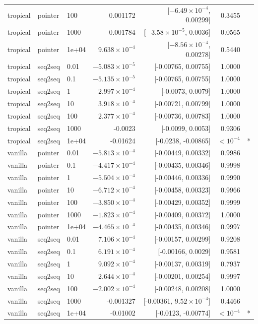 \documentclass[10pt]{article}
\begin{document}
{\begin{longtable}{lllrrrl}
tropical & pointer & 100 & 0.001172 & [$-6.49\times10^{-4}$, 0.00299] & 0.3455 & \\
tropical & pointer & 1000 & 0.001784 & [$-3.58\times10^{-5}$, 0.0036] & 0.0565 & \\
tropical & pointer & 1e+04 & $9.638\times10^{-4}$ & [$-8.56\times10^{-4}$, 0.00278] & 0.5440 & \\
tropical & seq2seq & 0.01 & $-5.083\times10^{-5}$ & [-0.00765, 0.00755] & 1.0000 & \\
tropical & seq2seq & 0.1 & $-5.135\times10^{-5}$ & [-0.00765, 0.00755] & 1.0000 & \\
tropical & seq2seq & 1 & $2.997\times10^{-4}$ & [-0.0073, 0.0079] & 1.0000 & \\
tropical & seq2seq & 10 & $3.918\times10^{-4}$ & [-0.00721, 0.00799] & 1.0000 & \\
tropical & seq2seq & 100 & $2.377\times10^{-4}$ & [-0.00736, 0.00783] & 1.0000 & \\
tropical & seq2seq & 1000 & -0.0023 & [-0.0099, 0.0053] & 0.9306 & \\
tropical & seq2seq & 1e+04 & -0.01624 & [-0.0238, -0.00865] & $<10^{-4}$ & *\\
vanilla & pointer & 0.01 & $-5.813\times10^{-4}$ & [-0.00449, 0.00332] & 0.9986 & \\
vanilla & pointer & 0.1 & $-4.417\times10^{-4}$ & [-0.00435, 0.00346] & 0.9998 & \\
vanilla & pointer & 1 & $-5.504\times10^{-4}$ & [-0.00446, 0.00336] & 0.9990 & \\
vanilla & pointer & 10 & $-6.712\times10^{-4}$ & [-0.00458, 0.00323] & 0.9966 & \\
vanilla & pointer & 100 & $-3.850\times10^{-4}$ & [-0.00429, 0.00352] & 0.9999 & \\
vanilla & pointer & 1000 & $-1.823\times10^{-4}$ & [-0.00409, 0.00372] & 1.0000 & \\
vanilla & pointer & 1e+04 & $-4.465\times10^{-4}$ & [-0.00435, 0.00346] & 0.9997 & \\
vanilla & seq2seq & 0.01 & $7.106\times10^{-4}$ & [-0.00157, 0.00299] & 0.9208 & \\
vanilla & seq2seq & 0.1 & $6.191\times10^{-4}$ & [-0.00166, 0.0029] & 0.9581 & \\
vanilla & seq2seq & 1 & $9.092\times10^{-4}$ & [-0.00137, 0.00319] & 0.7937 & \\
vanilla & seq2seq & 10 & $2.644\times10^{-4}$ & [-0.00201, 0.00254] & 0.9997 & \\
vanilla & seq2seq & 100 & $-2.002\times10^{-4}$ & [-0.00248, 0.00208] & 1.0000 & \\
vanilla & seq2seq & 1000 & -0.001327 & [-0.00361, $9.52\times10^{-4}$] & 0.4466 & \\
vanilla & seq2seq & 1e+04 & -0.01002 & [-0.0123, -0.00774] & $<10^{-4}$ & *\\
\bottomrule
\end{longtable}
}
\end{document}
